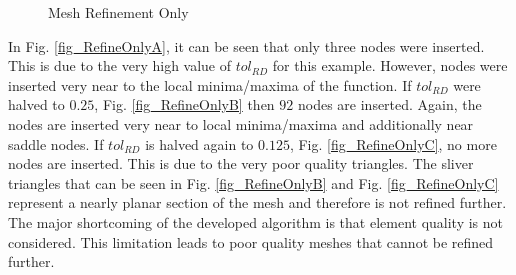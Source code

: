 \begin{figure}[h!]
  \begin{center}


  \caption{Mesh Refinement Only}
  \label{fig_RefineOnly}
  \end{center}
\end{figure}

In Fig. \ref{fig_RefineOnlyA}, it can be seen that only three nodes were
inserted. This is due to the very high value of $tol_{RD}$ for this
example. However, nodes were inserted very near to the local
minima/maxima of the function. If $tol_{RD}$ were halved to $0.25$, Fig.
\ref{fig_RefineOnlyB} then $92$ nodes are inserted. Again, the nodes are
inserted very near to local minima/maxima and additionally near saddle
nodes. If $tol_{RD}$ is halved again to $0.125$, Fig.
\ref{fig_RefineOnlyC}, no more nodes are inserted. This is due to the
very poor quality triangles. The sliver triangles that can be seen in
Fig. \ref{fig_RefineOnlyB} and Fig. \ref{fig_RefineOnlyC} represent a
nearly planar section of the mesh and therefore is not refined further.
The major shortcoming of the developed algorithm is that element quality
is not considered. This limitation leads to poor quality meshes that
cannot be refined further.

